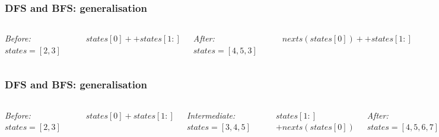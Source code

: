 \begin{frame}[fragile]\frametitle{DFS and BFS: generalisation}

\begin{columns}[t]

\emph{Before:}\\
$states = [2, 3]$
\begin{center}

\end{center}

$states[0] ++ states[1:]$


\emph{After:}\\
$states = [4, 5, 3]$
\begin{center}

\end{center}

$nexts(states[0]) ++ states[1:]$

\end{columns}

\end{frame}

\begin{frame}[fragile]\frametitle{DFS and BFS: generalisation}

\begin{columns}[t]

\emph{Before:}\\
$states = [2, 3]$
\begin{center}

\end{center}

$states[0] + states[1:]$


\emph{Intermediate:}\\
$states = [3, 4, 5]$
\begin{center}

\end{center}

$states[1:]$\\
$+ nexts(states[0])$


\emph{After:}\\
$states = [4, 5, 6, 7]$
\begin{center}

\end{center}

$states[2:]$\\
$+ nexts(states[0])$\\
$+ nexts(states[1])$

\end{columns}

\end{frame}

